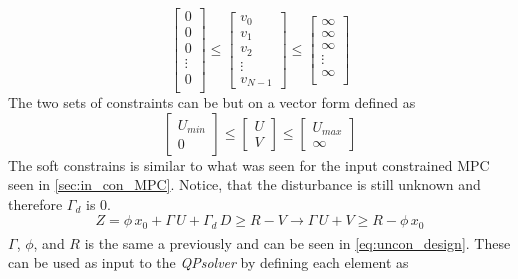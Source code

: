 \begin{equation}
    \begin{bmatrix}
        0\\
        0\\
        0\\
        \vdots\\
        0\\
    \end{bmatrix} \leq
        \begin{bmatrix}
        v_0\\
        v_1\\
        v_2\\
        \vdots\\
        v_{N-1}
    \end{bmatrix}\leq
    \begin{bmatrix}
        \infty\\
        \infty\\
        \infty\\
        \vdots\\
        \infty\\
    \end{bmatrix}
    \label{eq:econ_mpc_v}
\end{equation}
The two sets of constraints can be but on a vector form defined as
\begin{equation}
    \begin{bmatrix}
        U_{min}\\
        0
    \end{bmatrix} \leq
    \begin{bmatrix}
        U\\
        V
    \end{bmatrix} \leq
    \begin{bmatrix}
        U_{max}\\
        \infty
    \end{bmatrix}
\end{equation}
The soft constrains is similar to what was seen for the input constrained MPC seen in \cref{sec:in_con_MPC}. Notice, that the disturbance is still unknown and therefore $\Gamma_d$ is 0.
\begin{equation}
    Z=\phi\,x_0+\Gamma\,U+\Gamma_d\,D\geq R-V\xrightarrow[]{}\Gamma\,U+V\geq R-\phi\,x_0
\end{equation}
$\Gamma$, $\phi$, and $R$ is the same a previously and can be seen in \cref{eq:uncon_design}. These can be used as input to the \textit{QPsolver} by defining each element as

